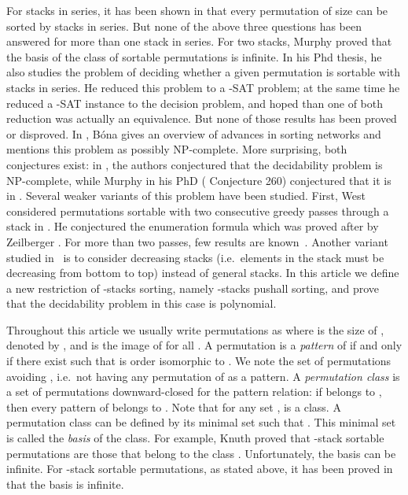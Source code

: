 \documentclass[11pt]{article}
\begin{document}
For stacks in series, it has been shown in \cite{Knuth68} that every permutation of size  can be sorted by  stacks in series. 
But none of the above three questions has been answered for more than one stack in series. 
For two stacks, Murphy \cite{Murphy02} proved that the basis of the class of sortable permutations is infinite. 
In his Phd thesis, he also studies the problem of deciding whether a given permutation is sortable with  stacks in series.
He reduced this problem to a -SAT problem;
at the same time he reduced a -SAT instance to the decision problem,
and hoped than one of both reduction was actually an equivalence.
But none of those results has been proved or disproved. 
In \cite{Bona02}, B\'ona gives an overview of advances in sorting networks and mentions this problem as possibly NP-complete.
More surprising, both conjectures exist:
in \cite{AMR02b}, the authors conjectured that the decidability problem is NP-complete,
while Murphy in his PhD (\cite{Murphy02} Conjecture 260) conjectured that it is in .
Several weaker variants of this problem have been studied. 
First, West considered permutations sortable with two consecutive greedy passes through a stack in \cite{West90, West93}. 
He conjectured the enumeration formula which was proved after by Zeilberger \cite{Zeilberger92}. 
For more than two passes, few results are known~\cite{BM00, Ulfarsson11}. 
Another variant studied in~\cite{AMR02b} is to consider decreasing stacks (i.e.~elements in the stack must be decreasing from bottom to top)
instead of general stacks.
In this article we define a new restriction of -stacks sorting, namely -stacks pushall sorting,
and prove that the decidability problem in this case is polynomial.

\bigskip
Throughout this article we usually write permutations as  
where  is the size of , denoted by , and  is the image of  for all . 
A permutation  is a {\em pattern} of  if and only if there exist 
 such that  is order isomorphic to . 
We note  the set of permutations avoiding , i.e.~not having any permutation of  as a pattern.
A {\em permutation class}  is a set of permutations downward-closed for the pattern relation: 
if  belongs to , then every pattern of  belongs to . 
Note that for any set ,  is a class.
A permutation class  can be defined by its minimal set  such that .
This minimal set is called the {\em basis} of the class. 
For example, Knuth proved that -stack sortable permutations are those that belong to the class .
Unfortunately, the basis can be infinite. 
For -stack sortable permutations, as stated above, it has been proved in~\cite{Murphy02} that the basis is infinite.
\end{document}
